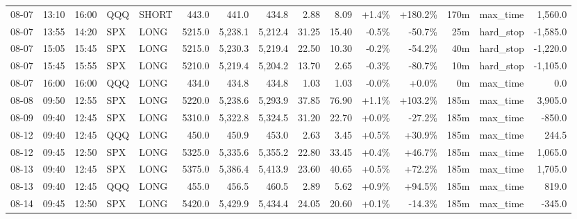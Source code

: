 \documentclass[11pt,a4paper,twoside]{article}
\begin{document}
\begin{landscape}
\begin{center}
\begin{longtable}{>{\color{txtmain}}l l l l l r r r r r r r r >{\color{txtmain}}l r}
08-07 & 13:10 & 16:00 & QQQ & SHORT & 443.0 & 441.0 & 434.8 & 2.88 & 8.09 & \textcolor{wingreen}{+1.4\%} & \textcolor{wingreen}{+180.2\%} & 170m & max\_time & \textcolor{wingreen}{1,560.0} \\
08-07 & 13:55 & 14:20 & SPX & LONG & 5215.0 & 5,238.1 & 5,212.4 & 31.25 & 15.40 & \textcolor{lossred}{-0.5\%} & \textcolor{lossred}{-50.7\%} & 25m & hard\_stop & \textcolor{lossred}{-1,585.0} \\
08-07 & 15:05 & 15:45 & SPX & LONG & 5215.0 & 5,230.3 & 5,219.4 & 22.50 & 10.30 & \textcolor{lossred}{-0.2\%} & \textcolor{lossred}{-54.2\%} & 40m & hard\_stop & \textcolor{lossred}{-1,220.0} \\
08-07 & 15:45 & 15:55 & SPX & LONG & 5210.0 & 5,219.4 & 5,204.2 & 13.70 & 2.65 & \textcolor{lossred}{-0.3\%} & \textcolor{lossred}{-80.7\%} & 10m & hard\_stop & \textcolor{lossred}{-1,105.0} \\
08-07 & 16:00 & 16:00 & QQQ & LONG & 434.0 & 434.8 & 434.8 & 1.03 & 1.03 & \textcolor{lossred}{-0.0\%} & \textcolor{wingreen}{+0.0\%} & 0m & max\_time & \textcolor{wingreen}{0.0} \\
08-08 & 09:50 & 12:55 & SPX & LONG & 5220.0 & 5,238.6 & 5,293.9 & 37.85 & 76.90 & \textcolor{wingreen}{+1.1\%} & \textcolor{wingreen}{+103.2\%} & 185m & max\_time & \textcolor{wingreen}{3,905.0} \\
08-09 & 09:40 & 12:45 & SPX & LONG & 5310.0 & 5,322.8 & 5,324.5 & 31.20 & 22.70 & \textcolor{wingreen}{+0.0\%} & \textcolor{lossred}{-27.2\%} & 185m & max\_time & \textcolor{lossred}{-850.0} \\
08-12 & 09:40 & 12:45 & QQQ & LONG & 450.0 & 450.9 & 453.0 & 2.63 & 3.45 & \textcolor{wingreen}{+0.5\%} & \textcolor{wingreen}{+30.9\%} & 185m & max\_time & \textcolor{wingreen}{244.5} \\
08-12 & 09:45 & 12:50 & SPX & LONG & 5325.0 & 5,335.6 & 5,355.2 & 22.80 & 33.45 & \textcolor{wingreen}{+0.4\%} & \textcolor{wingreen}{+46.7\%} & 185m & max\_time & \textcolor{wingreen}{1,065.0} \\
08-13 & 09:40 & 12:45 & SPX & LONG & 5375.0 & 5,386.4 & 5,413.9 & 23.60 & 40.65 & \textcolor{wingreen}{+0.5\%} & \textcolor{wingreen}{+72.2\%} & 185m & max\_time & \textcolor{wingreen}{1,705.0} \\
08-13 & 09:40 & 12:45 & QQQ & LONG & 455.0 & 456.5 & 460.5 & 2.89 & 5.62 & \textcolor{wingreen}{+0.9\%} & \textcolor{wingreen}{+94.5\%} & 185m & max\_time & \textcolor{wingreen}{819.0} \\
08-14 & 09:45 & 12:50 & SPX & LONG & 5420.0 & 5,429.9 & 5,434.4 & 24.05 & 20.60 & \textcolor{wingreen}{+0.1\%} & \textcolor{lossred}{-14.3\%} & 185m & max\_time & \textcolor{lossred}{-345.0} \\

\end{longtable}
\end{center}
\end{landscape}
\end{document}
